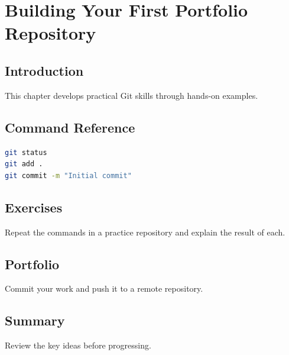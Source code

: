 \chapter{Building Your First Portfolio Repository}
\label{chap:vol2-10}



\section{Introduction}
This chapter develops practical Git skills through hands-on examples.

\section{Command Reference}
\begin{lstlisting}[language=bash]
git status
git add .
git commit -m "Initial commit"
\end{lstlisting}

\section{Exercises}
\begin{exercise}
Repeat the commands in a practice repository and explain the result of each.
\end{exercise}

\section{Portfolio}
Commit your work and push it to a remote repository.

\section{Summary}
Review the key ideas before progressing.
